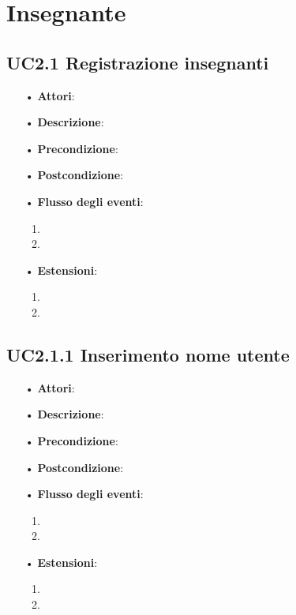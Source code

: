 
\section{Insegnante}

\subsection{UC2.1 Registrazione insegnanti}

\begin{itemize}
	\item[•] \textbf{Attori}: 
	\item[•] \textbf{Descrizione}:
	\item[•] \textbf{Precondizione}:
	\item[•] \textbf{Postcondizione}:
	\item[•] \textbf{Flusso degli eventi}:
		\begin{enumerate}
			\item
			\item
		\end{enumerate}
	\item[•] \textbf{Estensioni}:
		\begin{enumerate}
			\item
			\item
		\end{enumerate}
\end{itemize}

\subsection{UC2.1.1 Inserimento nome utente}
\begin{itemize}
	\item[•] \textbf{Attori}: 
	\item[•] \textbf{Descrizione}:
	\item[•] \textbf{Precondizione}:
	\item[•] \textbf{Postcondizione}:
	\item[•] \textbf{Flusso degli eventi}:
		\begin{enumerate}
			\item
			\item
		\end{enumerate}
	\item[•] \textbf{Estensioni}:
		\begin{enumerate}
			\item
			\item
		\end{enumerate}
\end{itemize}

